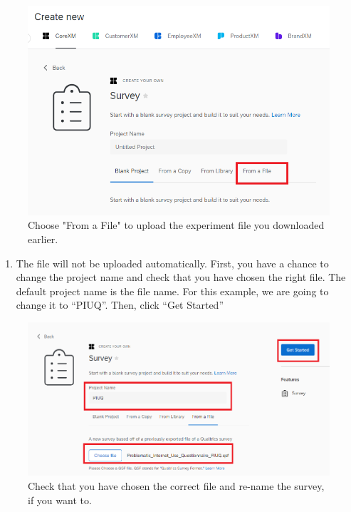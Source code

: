 \documentclass[
]{book}
\providecommand{\tightlist}{%
  \setlength{\itemsep}{0pt}\setlength{\parskip}{0pt}}
\begin{document}
\begin{figure}

{\centering \includegraphics[width=0.85\linewidth]{images/Qualtrics/04FromFile} 

}

\caption{Choose "From a File" to upload the experiment file you downloaded earlier.}\label{fig:Figure11-4}
\end{figure}

\begin{enumerate}
\def\labelenumi{\arabic{enumi}.}
\setcounter{enumi}{4}
\tightlist
\item
  The file will not be uploaded automatically. First, you have a chance to change the project name and check that you have chosen the right file. The default project name is the file name. For this example, we are going to change it to ``PIUQ''. Then, click ``Get Started''
\end{enumerate}

\begin{figure}

{\centering \includegraphics[width=0.85\linewidth]{images/Qualtrics/05FromFile2} 

}

\caption{Check that you have chosen the correct file and re-name the survey, if you want to.}\label{fig:Figure11-5}
\end{figure}
\end{document}

